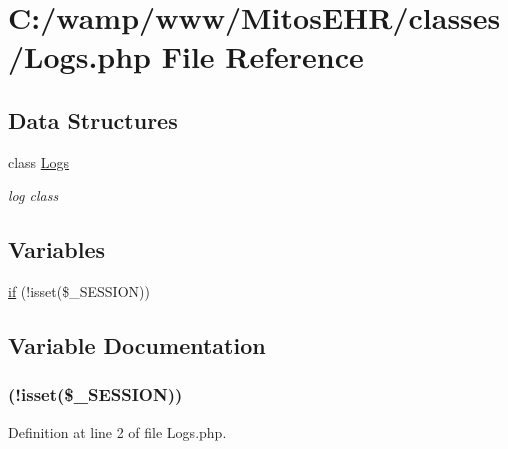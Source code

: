 \hypertarget{_logs_8php}{\section{\-C\-:/wamp/www/\-Mitos\-E\-H\-R/classes/\-Logs.php \-File \-Reference}
\label{_logs_8php}
}
\subsection*{\-Data \-Structures}
\begin{DoxyCompactItemize}
\item 
class \hyperlink{class_logs}{\-Logs}
\begin{DoxyCompactList}\small\item\em log class \end{DoxyCompactList}\end{DoxyCompactItemize}
\subsection*{\-Variables}
\begin{DoxyCompactItemize}
\item 
\hyperlink{_logs_8php_a8ceca98aa29914fd2479a84a8d2242fb}{if} (!isset(\$\-\_\-\-S\-E\-S\-S\-I\-O\-N))
\end{DoxyCompactItemize}


\subsection{\-Variable \-Documentation}
\hypertarget{_logs_8php_a8ceca98aa29914fd2479a84a8d2242fb}{
\subsubsection[{if}]{(!isset(\$\-\_\-\-S\-E\-S\-S\-I\-O\-N))}}\label{_logs_8php_a8ceca98aa29914fd2479a84a8d2242fb}


\-Definition at line 2 of file \-Logs.\-php.

